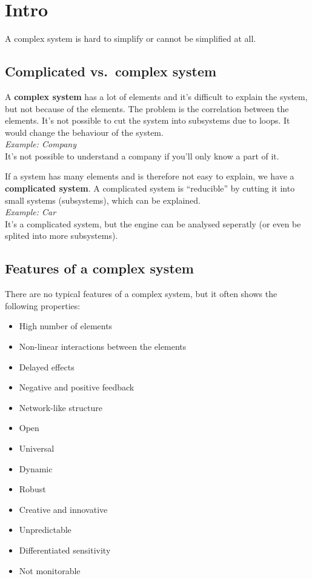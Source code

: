 \hypertarget{intro}{%
\section{Intro}\label{intro}}

A complex system is hard to simplify or cannot be simplified at all.

\hypertarget{complicated-vs.complex-system}{%
\subsection{Complicated vs.~complex
system}\label{complicated-vs.complex-system}}

A \textbf{complex system} has a lot of elements and it's difficult to
explain the system, but not because of the elements. The problem is the
correlation between the elements. It's not possible to cut the system
into subsystems due to loops. It would change the behaviour of the
system.\\
\emph{Example: Company}\\
It's not possible to understand a company if you'll only know a part of
it.

If a system has many elements and is therefore not easy to explain, we
have a \textbf{complicated system}. A complicated system is
``reducible'' by cutting it into small systems (subsystems), which can
be explained.\\
\emph{Example: Car}\\
It's a complicated system, but the engine can be analysed seperatly (or
even be splited into more subsystems).

\hypertarget{features-of-a-complex-system}{%
\subsection{Features of a complex
system}\label{features-of-a-complex-system}}

There are no typical features of a complex system, but it often shows
the following properties:

\begin{itemize}
\tightlist
\item
  High number of elements
\item
  Non-linear interactions between the elements
\item
  Delayed effects
\item
  Negative and positive feedback
\item
  Network-like structure
\item
  Open
\item
  Universal
\item
  Dynamic
\item
  Robust
\item
  Creative and innovative
\item
  Unpredictable
\item
  Differentiated sensitivity
\item
  Not monitorable
\end{itemize}

